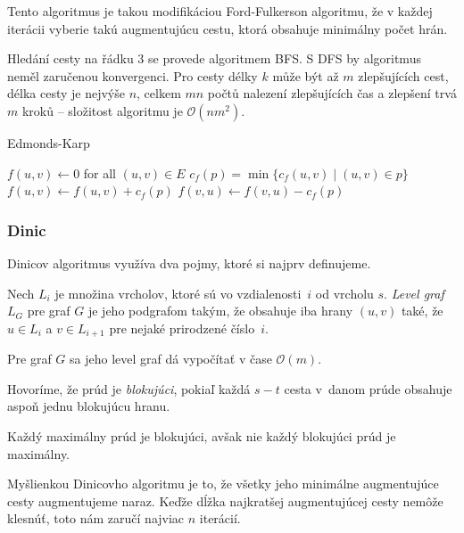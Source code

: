 Tento algoritmus je takou modifikáciou Ford-Fulkerson algoritmu,
že v každej iterácii vyberie takú augmentujúcu cestu, ktorá obsahuje
minimálny počet hrán.

Hledání cesty na řádku 3 se provede algoritmem BFS. S DFS by algoritmus
neměl zaručenou konvergenci. Pro cesty délky $k$
může být až $m$ zlepšujících cest, délka cesty je nejvýše
$n$, celkem $mn$
počtů nalezení zlepšujících čas a zlepšení trvá $m$
kroků -- složitost algoritmu je
$\mathcal{O}(nm^2)$.

\begin{algorithm}[H]
\caption{Edmonds-Karp}
\begin{algorithmic}[1]
    \State $f(u,v) \gets 0$ for all $(u,v) \in E$
        \State $c_f(p) = \min \{ c_f(u,v) \mid (u,v) \in p \}$
            \State $f(u,v) \gets f(u,v) + c_f(p)$
            \State $f(v,u) \gets f(v,u) - c_f(p)$
        \EndFor
    \EndWhile
\EndFunction
\end{algorithmic}
\end{algorithm}

\subsubsection{Dinic}
Dinicov algoritmus využíva dva pojmy, ktoré si najprv definujeme.

\begin{definition}
Nech $L_i$ je množina vrcholov, ktoré sú vo vzdialenosti~$i$ od
vrcholu $s$. {\em Level graf} $L_G$ pre graf $G$ je jeho podgrafom
takým, že obsahuje iba hrany $(u,v)$ také, že $u \in L_i$ a 
$v \in L_{i+1}$ pre nejaké prirodzené číslo~$i$.
\end{definition}

Pre graf $G$ sa jeho level graf dá vypočítať v čase $\mathcal{O}(m)$.

\begin{definition}
Hovoríme, že prúd je {\em blokujúci}, pokiaľ každá $s-t$ cesta v~danom
prúde obsahuje aspoň jednu blokujúcu hranu. 
\end{definition}

\begin{lemma}
	Každý maximálny prúd je blokujúci, avšak nie každý blokujúci prúd
	je maximálny.
\end{lemma}

Myšlienkou Dinicovho algoritmu je to, že všetky jeho minimálne augmentujúce
cesty augmentujeme naraz. Keďže dĺžka najkratšej augmentujúcej cesty
nemôže klesnúť, toto nám zaručí najviac $n$ iterácií.

